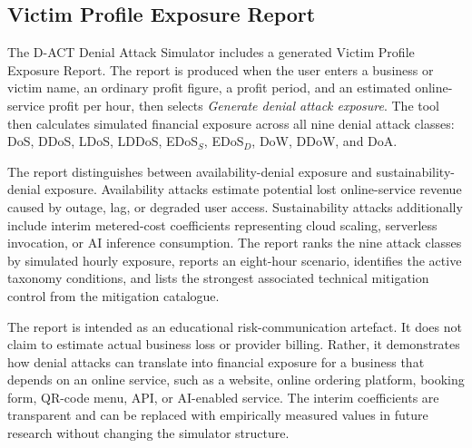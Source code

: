 \subsection{Victim Profile Exposure Report}
\label{app:victim_exposure_report}

The D-ACT Denial Attack Simulator includes a generated Victim Profile Exposure Report. The report is produced when the user enters a business or victim name, an ordinary profit figure, a profit period, and an estimated online-service profit per hour, then selects \emph{Generate denial attack exposure}. The tool then calculates simulated financial exposure across all nine denial attack classes: DoS, DDoS, LDoS, LDDoS, EDoS\(_S\), EDoS\(_D\), DoW, DDoW, and DoA.

The report distinguishes between availability-denial exposure and sustainability-denial exposure. Availability attacks estimate potential lost online-service revenue caused by outage, lag, or degraded user access. Sustainability attacks additionally include interim metered-cost coefficients representing cloud scaling, serverless invocation, or AI inference consumption. The report ranks the nine attack classes by simulated hourly exposure, reports an eight-hour scenario, identifies the active taxonomy conditions, and lists the strongest associated technical mitigation control from the mitigation catalogue.

The report is intended as an educational risk-communication artefact. It does not claim to estimate actual business loss or provider billing. Rather, it demonstrates how denial attacks can translate into financial exposure for a business that depends on an online service, such as a website, online ordering platform, booking form, QR-code menu, API, or AI-enabled service. The interim coefficients are transparent and can be replaced with empirically measured values in future research without changing the simulator structure.

